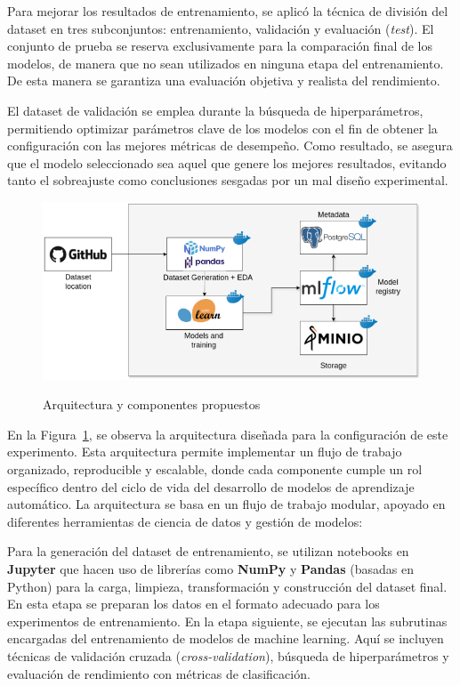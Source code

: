 \documentclass[11pt,a4paper,spanish]{book}
\numberwithin{equation}{chapter}
\numberwithin{figure}{chapter}
\begin{document}
Para mejorar los resultados de entrenamiento, se aplicó la técnica de división del 
dataset en tres subconjuntos: entrenamiento, validación y evaluación (\textit{test}). 
El conjunto de prueba se reserva exclusivamente para la comparación final de los modelos,
de manera que no sean utilizados en ninguna etapa del entrenamiento. 
De esta manera se garantiza una evaluación objetiva y realista del rendimiento. 


El dataset de validación se emplea durante la búsqueda de 
hiperparámetros, permitiendo optimizar parámetros clave de los modelos con el fin de 
obtener la configuración con las mejores métricas de desempeño. Como resultado, se 
asegura que el modelo seleccionado sea aquel que genere los mejores resultados, evitando
tanto el sobreajuste como conclusiones sesgadas por un mal diseño experimental.


\begin{figure}[h]
    \caption{Arquitectura y componentes propuestos}
    \centering
    \includegraphics[width=1\textwidth]{media/arquitecura.png}
    \label{fig:figArchitecture}
\end{figure}


En la Figura~\ref{fig:figArchitecture}, se observa la arquitectura diseñada para la 
configuración de este experimento. Esta arquitectura permite implementar un flujo de 
trabajo organizado, reproducible y escalable, donde cada componente cumple un rol 
específico dentro del ciclo de vida del desarrollo de modelos de aprendizaje automático.
La arquitectura se basa en un flujo de trabajo modular, apoyado en diferentes 
herramientas de ciencia de datos y gestión de modelos:


Para la generación del dataset de entrenamiento, se utilizan notebooks en \textbf{Jupyter} 
que hacen uso de librerías como \textbf{NumPy} y \textbf{Pandas} (basadas en Python) para 
la carga, limpieza, transformación y construcción del dataset final. En esta etapa se 
preparan los datos en el formato adecuado para los experimentos de entrenamiento. 
En la etapa siguiente, se ejecutan las subrutinas encargadas del entrenamiento de 
modelos de machine learning. Aquí se incluyen técnicas de 
validación cruzada (\textit{cross-validation}), búsqueda de hiperparámetros 
y evaluación de rendimiento con métricas de clasificación.
\end{document}
